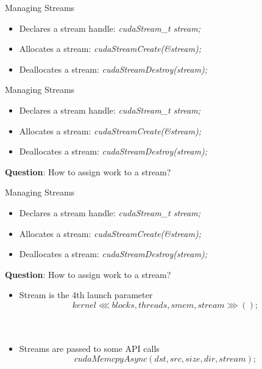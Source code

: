 \documentclass[9pt]{beamer}
\begin{document}
\begin{frame}[t]{Managing Streams}
\begin{itemize}
\item Declares a stream handle: \textit{cudaStream\_t stream;}
\medskip
\item Allocates a stream: \textit{cudaStreamCreate(\&stream);}
\medskip
\item Deallocates a stream: \textit{cudaStreamDestroy(stream);}
\medskip
\end{itemize}
\end{frame}

\begin{frame}[t]{Managing Streams}
\begin{itemize}
\item Declares a stream handle: \textit{cudaStream\_t stream;}
\medskip
\item Allocates a stream: \textit{cudaStreamCreate(\&stream);}
\medskip
\item Deallocates a stream: \textit{cudaStreamDestroy(stream);}
\medskip
\end{itemize}

\textbf{Question}: How to assign work to a stream?
\end{frame}


\begin{frame}[t]{Managing Streams}
\begin{itemize}
\item Declares a stream handle: \textit{cudaStream\_t stream;}
\medskip
\item Allocates a stream: \textit{cudaStreamCreate(\&stream);}
\medskip
\item Deallocates a stream: \textit{cudaStreamDestroy(stream);}
\medskip
\end{itemize}

\textbf{Question}: How to assign work to a stream?
 
\begin{itemize}
\item Stream is the 4th launch parameter\\
\[kernel \lll blocks , threads, smem, stream \ggg (); \]
\\~\\
\item Streams are passed to some API calls\\
\[cudaMemcpyAsync( dst, src, size, dir, stream); \]
\end{itemize}
\end{frame}
\end{document}
